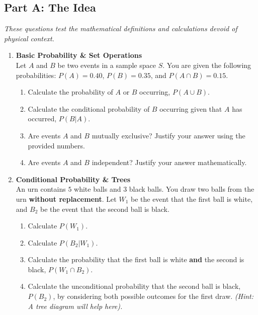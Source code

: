 \subsection*{Part A: The Idea}
\textit{These questions test the mathematical definitions and calculations devoid of physical context.}

\begin{enumerate}[label=\textbf{Q\arabic*.}, leftmargin=*]

    \item \textbf{Basic Probability \& Set Operations} \\
    Let $A$ and $B$ be two events in a sample space $S$. You are given the following probabilities:
    $P(A) = 0.40$, $P(B) = 0.35$, and $P(A \cap B) = 0.15$.
    \begin{enumerate}[label=\arabic*.]
        \item Calculate the probability of $A$ or $B$ occurring, $P(A \cup B)$.
        \item Calculate the conditional probability of $B$ occurring given that $A$ has occurred, $P(B|A)$.
        \item Are events $A$ and $B$ mutually exclusive? Justify your answer using the provided numbers.
        \item Are events $A$ and $B$ independent? Justify your answer mathematically.
    \end{enumerate}
    \vspace{0.3cm}

    \item \textbf{Conditional Probability \& Trees} \\
    An urn contains $5$ white balls and $3$ black balls. You draw two balls from the urn \textbf{without replacement}. Let $W_1$ be the event that the first ball is white, and $B_2$ be the event that the second ball is black.
    \begin{enumerate}[label=\arabic*.]
        \item Calculate $P(W_1)$.
        \item Calculate $P(B_2 | W_1)$. 
        \item Calculate the probability that the first ball is white \textbf{and} the second is black, $P(W_1 \cap B_2)$.
        \item Calculate the unconditional probability that the second ball is black, $P(B_2)$, by considering both possible outcomes for the first draw. \textit{(Hint: A tree diagram will help here).}
    \end{enumerate}

\end{enumerate}

